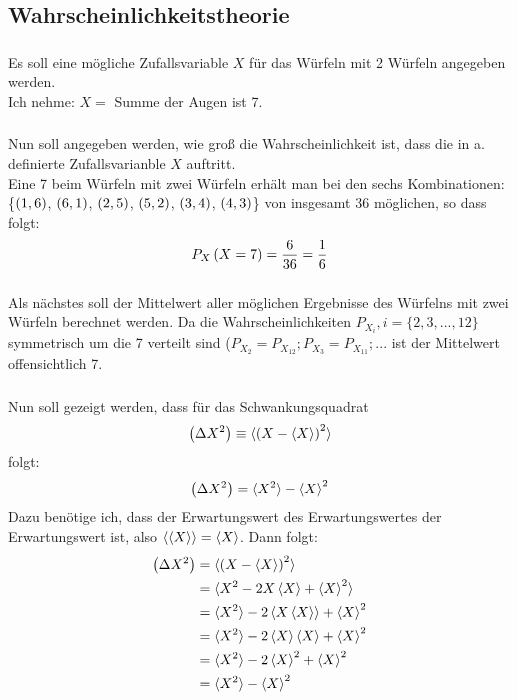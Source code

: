 \documentclass[11pt, ngerman, fleqn, DIV=15, headinclude]{scrartcl}
\begin{document}
\subsection{Wahrscheinlichkeitstheorie}

\subsubsection{}
Es soll eine mögliche Zufallsvariable $X$ für das Würfeln mit 2 Würfeln angegeben werden.\\
Ich nehme: $X=$ Summe der Augen ist 7.

\subsubsection{}
Nun soll angegeben werden, wie groß die Wahrscheinlichkeit ist, dass die in a. definierte Zufallsvarianble $X$ auftritt.\\
Eine 7 beim Würfeln mit zwei Würfeln erhält man bei den sechs Kombinationen:
\{$\left( 1,6 \right)$, $\left( 6,1 \right)$, $\left( 2,5 \right)$, $\left( 5,2 \right)$, $\left( 3,4 \right)$, $\left( 4,3 \right)$\} von insgesamt 36 möglichen, so dass folgt:
\begin{align*}
	P_X\left( X=7 \right)=\frac6{36}=\frac16
\end{align*}

\subsubsection{}
Als nächstes soll der Mittelwert aller möglichen Ergebnisse des Würfelns mit zwei Würfeln berechnet werden. Da die Wahrscheinlichkeiten $P_{X_i}, i =\{2,3,...,12\}$ symmetrisch um die 7 verteilt sind ($P_{X_2} = P_{X_{12}}; P_{X_3} = P_{X_{11}}; ...$ ist der Mittelwert offensichtlich 7.

\subsubsection{}
Nun soll gezeigt werden, dass für das Schwankungsquadrat
\begin{align*}
	\left( \Delta X^2 \right)\equiv\braket{\left( X - \braket{X} \right)^2}
\end{align*}
folgt:
\begin{align*}
	\left( \Delta X^2 \right)=\braket{X^2} - \braket{X}^2
\end{align*}
Dazu benötige ich, dass der Erwartungswert des Erwartungswertes der Erwartungswert ist, also $\braket{\braket{X}} = \braket{X}$. Dann folgt:
\begin{align*}
	\left( \Delta X^2 \right)	&= \braket{\left( X - \braket{X} \right)^2}\\
						&= \braket{X^2 - 2X\braket{X} + \braket{X}^2}\\
						&= \braket{X^2} - 2\braket{X\braket{X}} + \braket{X}^2\\
						&= \braket{X^2} - 2\braket{X}\braket{X} + \braket{X}^2\\
						&= \braket{X^2} - 2\braket{X}^2 + \braket{X}^2\\
						&= \braket{X^2} - \braket{X}^2
\end{align*}
\end{document}
